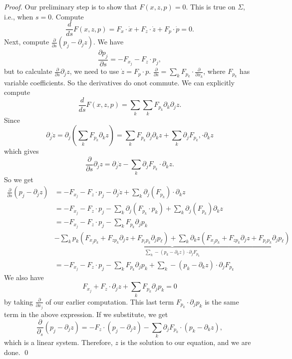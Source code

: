 \begin{proof}
    Our preliminary step is to show that $F(x,z,p)=0$. This is true on $\Sigma$, i.e., when $s=0$. Compute 
    \[
        \frac{d}{ds}F(x,z,p) = F_x \cdot \dot x + F_z \cdot \dot z + F_p \cdot \dot p = 0.
    \]
    Next, compute $\frac{\partial}{ \partial s}(p_j - \partial_j z)$. We have 
    \[
        \frac{\partial p_j}{\partial s} = -F_{x_j}  - F_z\cdot p_j,
    \]
    but to calculate $\frac{\partial}{\partial s} \partial_j z$, we need to use $\dot z = F_p \cdot p$. $\frac{\partial}{\partial s} = \sum_k F_{p_k} \cdot \frac{\partial}{\partial x_k}$, where $F_{p_k}$ has variable coefficients. So the derivatives do onot commute. We can explicitly compute 
    \[
        \frac{d}{ds}F(x,z,p) = \sum_k  \sum_k F_{p_k} \partial_k \partial_j z.
    \]
    Since 
    \[
        \partial_{j} \dot{z}=\partial_{j}\left(\sum_k F_{p_{k}} \partial_{k} z\right)=\sum_k F_{p_{k}} \partial_{j} \partial_{k} z+\sum_k \partial_{j} F_{p_{k}},\cdot \partial_{k} z
    \]
    which gives 
    \[
        \frac{\partial}{\partial s} \partial_{j} z=\partial_{j} \dot{z}-\sum_k \partial_{j} F_{p_{k}} \cdot \partial_{k} z.
    \]
    So we get 
    \[
        \begin{aligned}
            \frac{\partial}{\partial s}\left(p_{j}-\partial_{j} z\right) &=-F_{x_{j}}-F_{z} \cdot p_{j}-\partial_{j} \dot{z}+\sum_k\partial_{j}\left(F_{p_{k}}\right) \cdot \partial_{k} z \\
            &=-F_{x_{j}}-F_{z} \cdot p_{j}-\sum_k\partial_{j}\left(F_{p_{k}} \cdot p_{k}\right)+\sum_k\partial_j\left(F_{p_{k}}\right) \partial_{k} z \\
            &=-F_{x_{j}}-F_{z} \cdot p_{j}-\sum_k F_{p_{k}} \partial_{j} p_{k} \\ & \underbrace{- \sum_k p_{k}\left(F_{x_{j} p_{k}}+F_{z p_{k}} \partial_{j} z+F_{p_{\ell} p_{k}} \partial_{j} p_{\ell}\right)+ \sum_k \partial_{k} z(F_{x_{j} p_{k}}+F_{z p_{k}} \partial_{j} z+F_{p_{\ell} p_{k}} \partial_{j} p_{\ell})}_{\sum_k -\left(p_{k}-\partial_{k} z\right) \cdot \partial_{j} F_{p_{k}}} \\
            &=-F_{x_{j}}-F_{z} \cdot p_{j}-\sum_kF_{p_{k}} \partial_{j} p_{k}+\sum_k -\left(p_{k}-\partial_{k} z\right) \cdot \partial_{j} F_{p_{k}}
            \end{aligned}
    \]
    We also have
    \[
        F_{x_{j}}+F_{z} \cdot \partial_{j} z+\sum_k F_{p_{k}} \partial_{j} p_{k}=0
    \]
    by taking $\frac{\partial}{\partial x_j}$ of our earlier computation. This last term $F_{p_k} \cdot \partial_j p_k$ is the same term in the above expression. If we substitute, we get
    \[
        \frac{\partial}{\partial_{s}}\left(p_{j}-\partial_{j} z\right)=-F_{z}\cdot \left(p_{j}-\partial_{j} z\right)-\sum_k\partial_{j} F_{p_{k}}\cdot \left(p_{k}-\partial_{k} z\right),
    \]
    which is a linear system.
    Therefore, $z$ is the solution to our equation, and we are done. \qed 
\end{proof}

